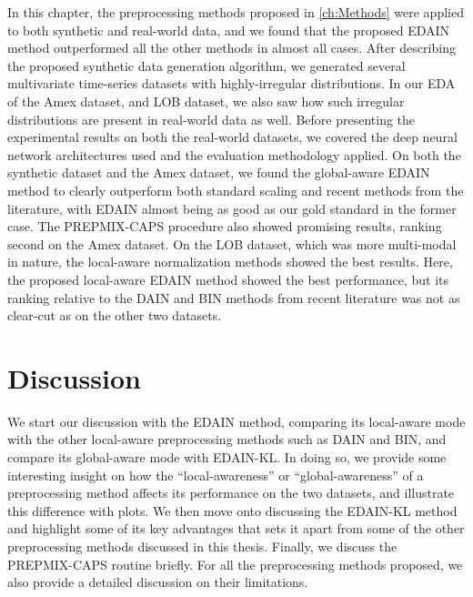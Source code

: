 \documentclass{statsmsc}
\begin{document}
{In this chapter, the preprocessing methods proposed in \cref{ch:Methods} were applied to
both synthetic and real-world data, and we found that the proposed \ac{EDAIN} method outperformed
all the other methods in almost all cases.
After describing the proposed synthetic data generation algorithm, we generated
several multivariate time-series datasets with highly-irregular distributions. In our
\ac{EDA} of the Amex dataset, and \ac{LOB} dataset, we also saw how such irregular distributions
are present in real-world data as well.
Before presenting the experimental results on both the real-world datasets, we covered
the deep neural network architectures used and the evaluation methodology applied.
On both the synthetic dataset and the Amex dataset, we found the global-aware \ac{EDAIN} method
to clearly outperform both standard scaling and recent methods from the literature, with
\ac{EDAIN} almost being as good as our gold standard in the former case.
The \ac{PREPMIX-CAPS} procedure also showed promising results, ranking second on the Amex dataset.
On the \ac{LOB} dataset, which was more multi-modal in nature, the local-aware normalization
methods showed the best results. Here, the proposed local-aware \ac{EDAIN} method showed
the best performance, but its ranking relative to the \ac{DAIN} and \ac{BIN} methods from recent
literature was not as clear-cut as on the other two datasets.


\chapter{Discussion} %
\label{ch:Discussion}


We start our discussion with the \ac{EDAIN} method, comparing its local-aware mode
with the other local-aware preprocessing methods such as
\ac{DAIN} and \ac{BIN}, and compare its global-aware mode with \ac{EDAIN-KL}.
In doing so, we provide some
interesting insight on how the ``local-awareness'' or ``global-awareness'' of a preprocessing method
affects its performance on the two datasets, and illustrate this difference with plots. We then move onto discussing the \ac{EDAIN-KL} method and highlight some of its key advantages
that sets it apart from some of the other preprocessing methods discussed in this thesis. Finally,
we discuss the \ac{PREPMIX-CAPS} routine briefly. For all the preprocessing methods proposed,
we also provide a detailed discussion on their limitations.

}
\end{document}
